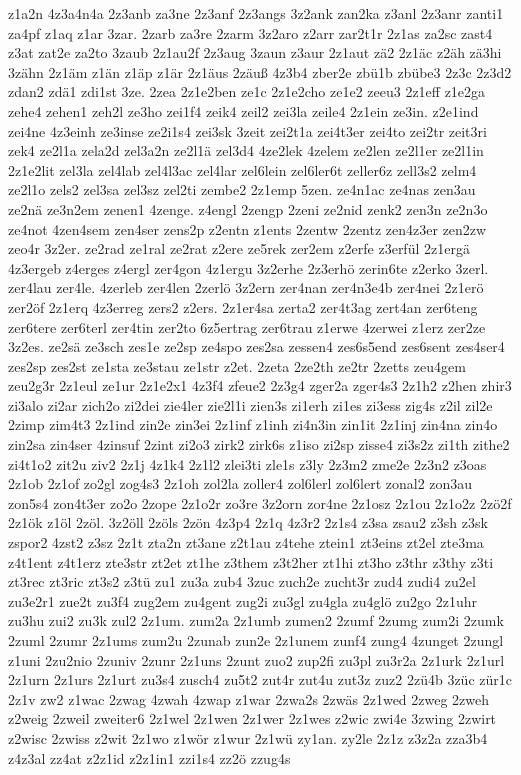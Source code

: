 {z1a2n
4z3a4n4a
2z3anb
za3ne
2z3anf
2z3angs
3z2ank
zan2ka
z3anl
2z3anr
zanti1
za4pf
z1aq
z1ar
3zar.
2zarb
za3re
2zarm
3z2aro
z2arr
zar2t1r
2z1as
za2sc
zast4
z3at
zat2e
za2to
3zaub
2z1au2f
2z3aug
3zaun
z3aur
2z1aut
zä2
2z1äc
z2äh
zä3hi
3zähn
2z1äm
z1än
z1äp
z1är
2z1äus
2zäuß
4z3b4
zber2e
zbü1b
zbübe3
2z3c
2z3d2
zdan2
zdä1
zdi1st
3ze.
2zea
2z1e2ben
ze1c
2z1e2cho
ze1e2
zeeu3
2z1eff
z1e2ga
zehe4
zehen1
zeh2l
ze3ho
zei1f4
zeik4
zeil2
zei3la
zeile4
2z1ein
ze3in.
z2e1ind
zei4ne
4z3einh
ze3inse
ze2i1s4
zei3sk
3zeit
zei2t1a
zei4t3er
zei4to
zei2tr
zeit3ri
zek4
ze2l1a
zela2d
zel3a2n
ze2l1ä
zel3d4
4ze2lek
4zelem
ze2len
ze2l1er
ze2l1in
2z1e2lit
zel3la
zel4lab
zel4l3ac
zel4lar
zel6lein
zel6ler6t
zeller6z
zell3s2
zelm4
ze2l1o
zels2
zel3sa
zel3sz
zel2ti
zembe2
2z1emp
5zen.
ze4n1ac
ze4nas
zen3au
ze2nä
ze3n2em
zenen1
4zenge.
z4engl
2zengp
2zeni
ze2nid
zenk2
zen3n
ze2n3o
ze4not
4zen4sem
zen4ser
zens2p
z2entn
z1ents
2zentw
2zentz
zen4z3er
zen2zw
zeo4r
3z2er.
ze2rad
ze1ral
ze2rat
z2ere
ze5rek
zer2em
z2erfe
z3erfül
2z1ergä
4z3ergeb
z4erges
z4ergl
zer4gon
4z1ergu
3z2erhe
2z3erhö
zerin6te
z2erko
3zerl.
zer4lau
zer4le.
4zerleb
zer4len
2zerlö
3z2ern
zer4nan
zer4n3e4b
zer4nei
2z1erö
zer2öf
2z1erq
4z3erreg
zers2
z2ers.
2z1er4sa
zerta2
zer4t3ag
zert4an
zer6teng
zer6tere
zer6terl
zer4tin
zer2to
6z5ertrag
zer6trau
z1erwe
4zerwei
z1erz
zer2ze
3z2es.
ze2sä
ze3sch
zes1e
ze2sp
ze4spo
zes2sa
zessen4
zes6s5end
zes6sent
zes4ser4
zes2sp
zes2st
ze1sta
ze3stau
ze1str
z2et.
2zeta
2ze2th
ze2tr
2zetts
zeu4gem
zeu2g3r
2z1eul
ze1ur
2z1e2x1
4z3f4
zfeue2
2z3g4
zger2a
zger4s3
2z1h2
z2hen
zhir3
zi3alo
zi2ar
zich2o
zi2dei
zie4ler
zie2l1i
zien3s
zi1erh
zi1es
zi3ess
zig4s
z2il
zil2e
2zimp
zim4t3
2z1ind
zin2e
zin3ei
2z1inf
z1inh
zi4n3in
zin1it
2z1inj
zin4na
zin4o
zin2sa
zin4ser
4zinsuf
2zint
zi2o3
zirk2
zirk6s
z1iso
zi2sp
zisse4
zi3s2z
zi1th
zithe2
zi4t1o2
zit2u
ziv2
2z1j
4z1k4
2z1l2
zlei3ti
zle1s
z3ly
2z3m2
zme2e
2z3n2
z3oas
2z1ob
2z1of
zo2gl
zog4s3
2z1oh
zol2la
zoller4
zol6lerl
zol6lert
zonal2
zon3au
zon5s4
zon4t3er
zo2o
2zope
2z1o2r
zo3re
3z2orn
zor4ne
2z1osz
2z1ou
2z1o2z
2zö2f
2z1ök
z1öl
2zöl.
3z2öll
2zöls
2zön
4z3p4
2z1q
4z3r2
2z1s4
z3sa
zsau2
z3sh
z3sk
zspor2
4zst2
z3sz
2z1t
zta2n
zt3ane
z2t1au
z4tehe
ztein1
zt3eins
zt2el
zte3ma
z4t1ent
z4t1erz
zte3str
zt2et
zt1he
z3them
z3t2her
zt1hi
zt3ho
z3thr
z3thy
z3ti
zt3rec
zt3ric
zt3s2
z3tü
zu1
zu3a
zub4
3zuc
zuch2e
zucht3r
zud4
zudi4
zu2el
zu3e2r1
zue2t
zu3f4
zug2em
zu4gent
zug2i
zu3gl
zu4gla
zu4glö
zu2go
2z1uhr
zu3hu
zui2
zu3k
zul2
2z1um.
zum2a
2z1umb
zumen2
2zumf
2zumg
zum2i
2zumk
2zuml
2zumr
2z1ums
zum2u
2zunab
zun2e
2z1unem
zunf4
zung4
4zunget
2zungl
z1uni
2zu2nio
2zuniv
2zunr
2z1uns
2zunt
zuo2
zup2fi
zu3pl
zu3r2a
2z1urk
2z1url
2z1urn
2z1urs
2z1urt
zu3s4
zusch4
zu5t2
zut4r
zut4u
zut3z
zuz2
2zü4b
3züc
zür1c
2z1v
zw2
z1wac
2zwag
4zwah
4zwap
z1war
2zwa2s
2zwäs
2z1wed
2zweg
2zweh
z2weig
2zweil
zweiter6
2z1wel
2z1wen
2z1wer
2z1wes
z2wic
zwi4e
3zwing
2zwirt
z2wisc
2zwiss
z2wit
2z1wo
z1wör
z1wur
2z1wü
zy1an.
zy2le
2z1z
z3z2a
zza3b4
z4z3al
zz4at
z2z1id
z2z1in1
zzi1s4
zz2ö
zzug4s
}

\endinput

